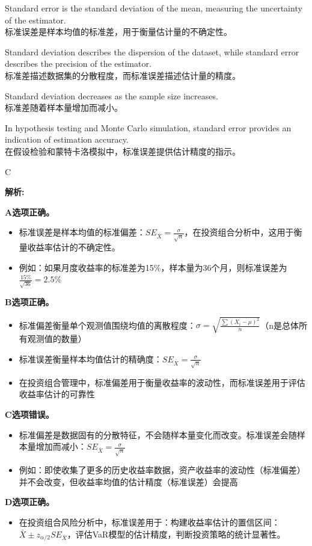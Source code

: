 \documentclass{article}
\newenvironment{explanation}
{\textbf{解析:}\par}
{\par}
\begin{document}
\begin{choices}
    \item Standard error is the standard deviation of the mean, measuring the uncertainty of the estimator.\\
    标准误差是样本均值的标准差，用于衡量估计量的不确定性。
    \item Standard deviation describes the dispersion of the dataset, while standard error describes the precision of the estimator.\\
    标准差描述数据集的分散程度，而标准误差描述估计量的精度。
    \item Standard deviation decreases as the sample size increases.\\
    标准差随着样本量增加而减小。
    \item In hypothesis testing and Monte Carlo simulation, standard error provides an indication of estimation accuracy.\\
    在假设检验和蒙特卡洛模拟中，标准误差提供估计精度的指示。
\end{choices}

\begin{correctanswer}
    C
\end{correctanswer}

\begin{explanation}
\textbf{A选项正确。}
\begin{itemize}
    \item 标准误差是样本均值的标准偏差：\(SE_{\bar{X}}=\frac{\sigma}{\sqrt{n}}\)，在投资组合分析中，这用于衡量收益率估计的不确定性。
    \item 例如：如果月度收益率的标准差为15\%，样本量为36个月，则标准误差为\(\frac{15\%}{\sqrt{36}}=2.5\%\)
\end{itemize}

\textbf{B选项正确。}
\begin{itemize}
    \item 标准偏差衡量单个观测值围绕均值的离散程度：\(\sigma=\sqrt{\frac{\sum(X_i-\mu)^2}{n}}\)（n是总体所有观测值的数量）
    \item 标准误差衡量样本均值估计的精确度：\(SE_{\bar{X}}=\frac{\sigma}{\sqrt{n}}\)
    \item 在投资组合管理中，标准偏差用于衡量收益率的波动性，而标准误差用于评估收益率估计的可靠性
\end{itemize}

\textbf{C选项错误。}
\begin{itemize}
    \item 标准偏差是数据固有的分散特征，不会随样本量变化而改变。标准误差会随样本量增加而减小：\(SE_{\bar{X}}=\frac{\sigma}{\sqrt{n}}\)
    \item 例如：即使收集了更多的历史收益率数据，资产收益率的波动性（标准偏差）并不会改变，但收益率均值的估计精度（标准误差）会提高
\end{itemize}

\textbf{D选项正确。}
\begin{itemize}
    \item 在投资组合风险分析中，标准误差用于：构建收益率估计的置信区间：\(\bar{X}\pm z_{\alpha/2}SE_{\bar{X}}\)，评估VaR模型的估计精度，判断投资策略的统计显著性。
\end{itemize}
\end{explanation}
\end{document}

